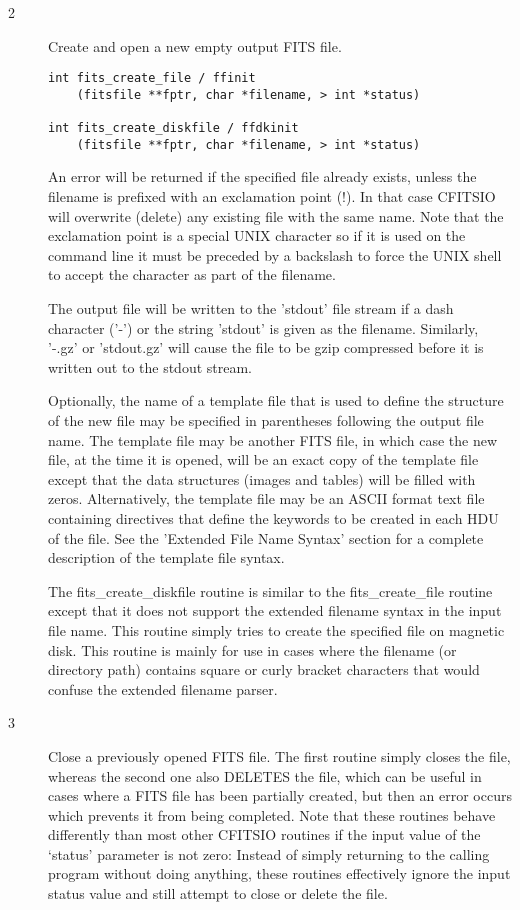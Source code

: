 \documentclass[11pt]{book}
\begin{document}
\begin{description}
\item[2 ]  Create and open a new empty output FITS file. \label{ffinit}


\begin{verbatim}
int fits_create_file / ffinit
    (fitsfile **fptr, char *filename, > int *status)

int fits_create_diskfile / ffdkinit
    (fitsfile **fptr, char *filename, > int *status)
\end{verbatim}

An error will be returned if the specified file already exists, unless
the filename is prefixed with an exclamation point (!). In that case
CFITSIO will overwrite (delete) any existing file with the same name.
Note that the exclamation point is a special UNIX character so if
it is used on the command line it must be preceded by a backslash to
force the UNIX shell to accept the character as part of the filename.

The output file will be written to the 'stdout' file stream if a dash
character ('-') or the string 'stdout' is given as the filename. Similarly,
'-.gz' or 'stdout.gz' will cause the file to be gzip compressed before
it is written out to the stdout stream.

Optionally, the name of a template file that is used to define the
structure of the new file may be specified in parentheses following the
output file name. The template file may be another FITS file, in which
case the new file, at the time it is opened, will be an exact copy of
the template file except that the data structures (images and tables)
will be filled with zeros. Alternatively, the template file may be an
ASCII format text file containing directives that define the keywords to be
created in each HDU of the file. See the 'Extended File Name Syntax'
 section for a complete description of the template file syntax.

The fits\_create\_diskfile routine is similar to the fits\_create\_file routine
except that it does not support the extended filename syntax in the input
file name.  This routine simply tries to create the specified file
on magnetic disk.  This routine is mainly for use in cases where the
filename (or directory path) contains square or curly bracket characters
 that would confuse the extended filename parser.
\end{description}



\begin{description}
\item[3 ] Close a previously opened FITS file.  The first routine simply
closes the file, whereas the second one also DELETES the file, which
can be useful in cases where a FITS file has been partially created,
but then an error occurs which prevents it from being completed.
Note that these routines behave differently than most other CFITSIO routines
if the input value of the `status' parameter is not zero:  Instead of
simply returning to the calling program without doing anything, these
routines effectively ignore the input status value and still attempt
to close or delete the file.
 \label{ffclos} \label{ffdelt}
\end{description}
\end{document}
